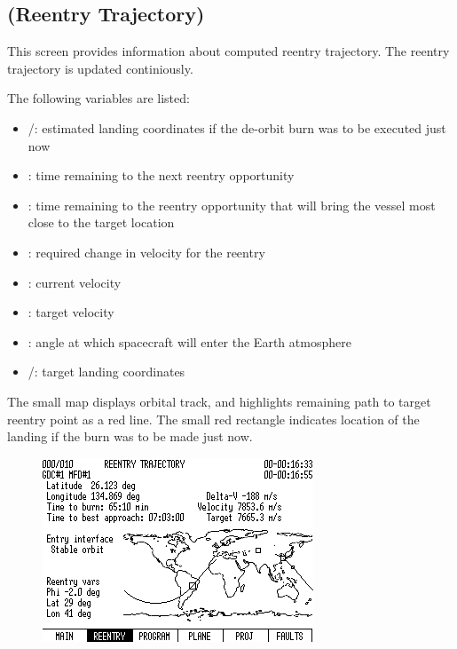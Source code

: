 


\subsection{ (Reentry Trajectory)}
This screen provides information about computed reentry trajectory. The reentry trajectory is updated continiously.

The following variables are listed:
\begin{itemize}
	\item {}/: estimated landing coordinates if the de-orbit burn was to be executed just now
	\item {}: time remaining to the next reentry opportunity
	\item {}: time remaining to the reentry opportunity that will bring the vessel most close to the target location
	\item {}: required change in velocity for the reentry
	\item {}: current velocity
	\item {}: target velocity
	\item {}: angle at which spacecraft will enter the Earth atmosphere
	\item {}/: target landing coordinates
\end{itemize}

The small map displays orbital track, and highlights remaining path to target reentry point as a red line. The small red rectangle indicates location of the landing if the burn was to be made just now.


\begin{figure}[htb]
\centering
\includegraphics[bb=0 0 9cm 7cm,scale=0.50]{../graphics/rv550_screen7.png}
\end{figure}

